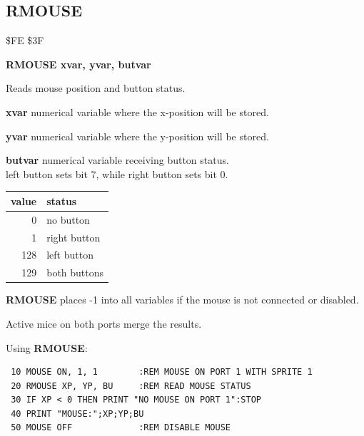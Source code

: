 \subsection{RMOUSE}
\begin{description}[leftmargin=2cm,style=nextline]
\item [Token:] \$FE \$3F
\item [Format:] {\bf RMOUSE xvar, yvar, butvar}
\item [Usage:] Reads mouse position and button status.

               {\bf xvar} numerical variable where the x-position will be stored.

               {\bf yvar} numerical variable where the y-position will be stored.

               {\bf butvar} numerical variable receiving button status. \\
               left button sets bit 7, while right button sets bit 0.

\begin{center}
{\setlength{\tabcolsep}{1mm}
\ttfamily
\begin{tabular}{|r|l|}
\hline
 value  & status \\
\hline
  0 & no button \\
  1 & right button \\
128 & left button \\
129 & both buttons \\
\hline
\end{tabular}
}
\end{center}

{\bf RMOUSE} places -1 into all variables
if the mouse is not connected or disabled.

\item [Remarks:] Active mice on both ports merge the results.
\item [Example:] Using {\bf RMOUSE}:
\begin{tcolorbox}[colback=black,coltext=white]
\verbatimfont{\codefont}
\begin{verbatim}
 10 MOUSE ON, 1, 1        :REM MOUSE ON PORT 1 WITH SPRITE 1
 20 RMOUSE XP, YP, BU     :REM READ MOUSE STATUS
 30 IF XP < 0 THEN PRINT "NO MOUSE ON PORT 1":STOP
 40 PRINT "MOUSE:";XP;YP;BU
 50 MOUSE OFF             :REM DISABLE MOUSE
\end{verbatim}
\end{tcolorbox}
\end{description}

